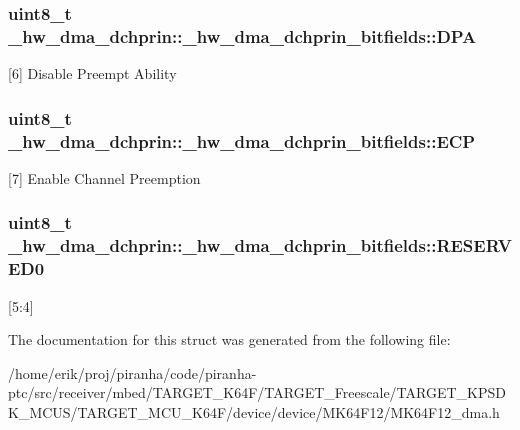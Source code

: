 \subsubsection[{\texorpdfstring{D\+PA}{DPA}}]{\setlength{\rightskip}{0pt plus 5cm}uint8\+\_\+t \+\_\+hw\+\_\+dma\+\_\+dchprin\+::\+\_\+hw\+\_\+dma\+\_\+dchprin\+\_\+bitfields\+::\+D\+PA}\hypertarget{struct__hw__dma__dchprin_1_1__hw__dma__dchprin__bitfields_a9887471c70c6e24d22a0a4097994b86f}{}\label{struct__hw__dma__dchprin_1_1__hw__dma__dchprin__bitfields_a9887471c70c6e24d22a0a4097994b86f}
\mbox{[}6\mbox{]} Disable Preempt Ability 
\subsubsection[{\texorpdfstring{E\+CP}{ECP}}]{\setlength{\rightskip}{0pt plus 5cm}uint8\+\_\+t \+\_\+hw\+\_\+dma\+\_\+dchprin\+::\+\_\+hw\+\_\+dma\+\_\+dchprin\+\_\+bitfields\+::\+E\+CP}\hypertarget{struct__hw__dma__dchprin_1_1__hw__dma__dchprin__bitfields_a5da3d7856bcfd896dab5df559abceaee}{}\label{struct__hw__dma__dchprin_1_1__hw__dma__dchprin__bitfields_a5da3d7856bcfd896dab5df559abceaee}
\mbox{[}7\mbox{]} Enable Channel Preemption 
\subsubsection[{\texorpdfstring{R\+E\+S\+E\+R\+V\+E\+D0}{RESERVED0}}]{\setlength{\rightskip}{0pt plus 5cm}uint8\+\_\+t \+\_\+hw\+\_\+dma\+\_\+dchprin\+::\+\_\+hw\+\_\+dma\+\_\+dchprin\+\_\+bitfields\+::\+R\+E\+S\+E\+R\+V\+E\+D0}\hypertarget{struct__hw__dma__dchprin_1_1__hw__dma__dchprin__bitfields_ab1a280c8aebfbd66f42bb3d5bc706ece}{}\label{struct__hw__dma__dchprin_1_1__hw__dma__dchprin__bitfields_ab1a280c8aebfbd66f42bb3d5bc706ece}
\mbox{[}5\+:4\mbox{]} 

The documentation for this struct was generated from the following file\+:\begin{DoxyCompactItemize}
\item 
/home/erik/proj/piranha/code/piranha-\/ptc/src/receiver/mbed/\+T\+A\+R\+G\+E\+T\+\_\+\+K64\+F/\+T\+A\+R\+G\+E\+T\+\_\+\+Freescale/\+T\+A\+R\+G\+E\+T\+\_\+\+K\+P\+S\+D\+K\+\_\+\+M\+C\+U\+S/\+T\+A\+R\+G\+E\+T\+\_\+\+M\+C\+U\+\_\+\+K64\+F/device/device/\+M\+K64\+F12/M\+K64\+F12\+\_\+dma.\+h\end{DoxyCompactItemize}
